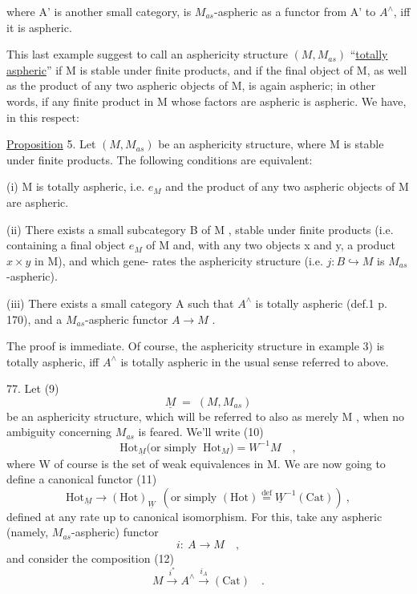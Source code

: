 
where A' is another small category,  is $M_{as}$-aspheric  as a functor from
 A' to $A^{\wedge}$, iff it is aspheric.

This last example suggest to call an asphericity structure $(M,M_{as})$
  ``\uline{totally aspheric}''  if M is stable under finite products,
and if the final object of M,  as well as the product of any two aspheric
objects of M,  is again aspheric;  in other words,  if any finite product
in M whose factors are aspheric is aspheric.  We have,  in this respect:

\uline{Proposition} 5.  Let $(M,M_{as})$ be an asphericity structure,  
where M is stable under finite products.  The following conditions are
equivalent:

(i)  M is totally aspheric,  i.e. $e_M$  and the product of any two
aspheric objects of M are aspheric.

(ii)  There exists a small  subcategory B of M ,  stable
under finite products (i.e. containing a final object $e_M$ of M and,  with
any two objects x and y,  a product  $x \times y$  in M),  and which  gene-%
rates the asphericity structure  (i.e.  $j\colon B\hookrightarrow M$  is $M_{as}$-aspheric).

(iii)  There exists a  small category A such that $A^{\wedge}$ is totally
aspheric (def.1  p. 170),  and a $M_{as}$-aspheric functor  $A \longrightarrow M$ .

\margin{$\big[$}The proof is immediate.  Of course,  the asphericity structure in
\margin{$\big[$}example 3)  is totally aspheric,  iff $A^{\wedge}$ is totally aspheric in the usual
\margin{$\big[$}sense referred to above.

\margin{$\ulcorner$}77.    Let
\margin{$\downarrow$}(9) \[ \underline{M} \;=\; (M,M_{as}) \]
be an asphericity structure,  which will be referred to also as merely
M ,  when no ambiguity concerning $M_{as}$  is feared.  We'll write
(10) \[ \mathrm{Hot}_{\underline{M}} \Big(\text{or simply }\ \mathrm{Hot}_{M}\Big) = W^{-1}M \quad , \]
where W of course is the set of weak equivalences in M.  We are now
going to define a canonical functor
(11) \[ \mathrm{Hot}_{\underline{M}} \longrightarrow (\mathrm{Hot})_{\underline{W}} \ \ (\text{or simply } (\mathrm{Hot}) \overset{\mathrm{def}}{=} \underline{W}^{-1}(\mathrm{Cat})) \ , \]
defined at any rate up to canonical isomorphism.  For this,  take any
aspheric (namely, $M_{as}$-aspheric) functor
\[ i\colon\ A \longrightarrow M \quad , \]
and consider the composition
(12) \[ M \xrightarrow{\ i^{*}\ } A^{\wedge} \xrightarrow{\ i_{A}\ } (\mathrm{Cat}) \quad . \]

